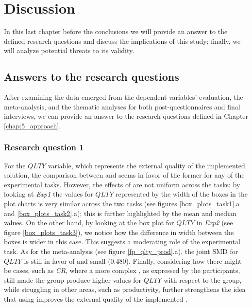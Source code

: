 \chapter{Discussion}
\label{chap:6_discussion}
In this last chapter before the conclusions we will provide an answer to the defined research questions and discuss the implications of this study; finally, we will analyze potential threats to its validity.

\section{Answers to the research questions}
After examining the data emerged from the dependent variables' evaluation, the meta-analysis, and the thematic analyses for both post-questionnaires and final interviews, we can provide an answer to the research questions defined in Chapter \ref{chap:5_approach}.



\subsection{Research question 1}
For the $QLTY$ variable, which represents the external quality of the implemented solution, the comparison between \tdd and \notdd seems in favor of the former for any of the experimental tasks. However, the effects of \tdd are not uniform across the tasks: by looking at \textit{Exp1} the values for $QLTY$ represented by the width of the boxes in the plot charts is very similar across the two tasks (see figures \ref{box_plots_task1}.a and \ref{box_plots_task2}.a); this is further highlighted by the mean and median values. 
On the other hand, by looking at the box plot for $QLTY$ in \textit{Exp2} (see figure \ref{box_plots_task3}), we notice how the difference in width between the boxes is wider in this case. This suggests a moderating role of the experimental task.
As for the meta-analysis (see figure \ref{fp_qlty_prod}.a), the joint SMD for $QLTY$ is still in favor of \tdd and small (0.480).
Finally, considering how there might be cases, such as \textit{CR}, where a more complex \es, as expressed by the participants, still made the \tdd group produce higher values for $QLTY$ with respect to the \notdd group, while struggling in other areas, such as productivity, further strengthens the idea that using \tdd improves the external quality of the implemented \es.



